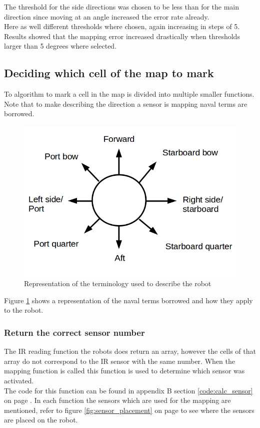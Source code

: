The threshold for the side directions was chosen to be less than for the main direction since moving at an angle increased the error rate already. \\
Here as well different thresholds where chosen, again increasing in steps of 5.\\
Results showed that the mapping error increased drastically when thresholds larger than 5 degrees where selected. \\


\subsection{Deciding which cell of the map to mark}
To algorithm to mark a cell in the map is divided into multiple smaller functions.\\
Note that to make describing the direction a sensor is mapping naval terms are borrowed. \\

\begin{figure}[h]
\centering
\includegraphics[scale=0.5]{Chapter3/images/robot_terminology.png}
\caption{Representation of the terminology used to describe the robot}
\label{fig:robot_terminology}
\end{figure}

Figure \ref{fig:robot_terminology} shows a representation of the naval terms borrowed and how they apply to the robot. 

\subsubsection{Return the correct sensor number}
\label{chap3:calc_sensor}
The IR reading function the robots does return an array, however the cells of that array do not correspond to the IR sensor with the same number. When the mapping function is called this function is used to determine which sensor was activated.\\
The code for this function can be found in appendix B section \ref{code:calc_sensor} on page \pageref{code:calc_sensor}. In each function the sensors which are used for the mapping are mentioned, refer to figure \ref{fig:sensor_placement} on page \pageref{fig:sensor_placement} to see where the sensors are placed on the robot. 

